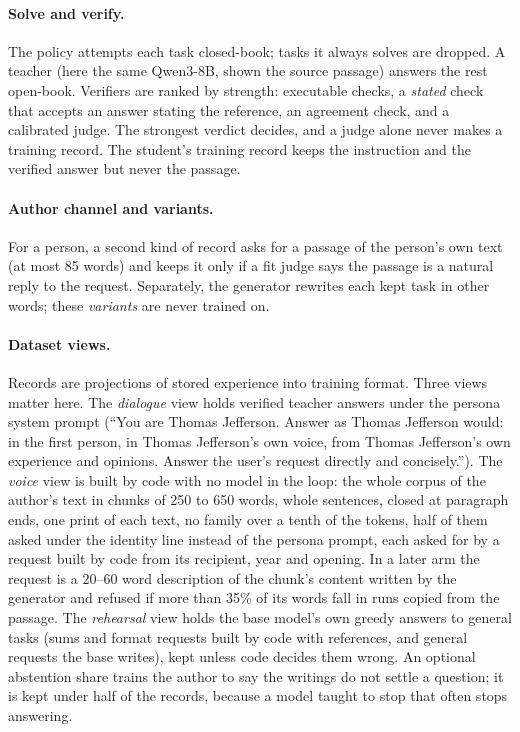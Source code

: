 \paragraph{Solve and verify.}
The policy attempts each task closed-book; tasks it always solves are dropped. A teacher
(here the same Qwen3-8B, shown the source passage) answers the rest open-book. Verifiers
are ranked by strength: executable checks, a \emph{stated} check that accepts an answer
stating the reference, an agreement check, and a calibrated judge. The strongest verdict
decides, and a judge alone never makes a training record. The student's training record
keeps the instruction and the verified answer but never the passage.

\paragraph{Author channel and variants.}
For a person, a second kind of record asks for a passage of the person's own text (at most 85
words) and keeps it only if a fit judge says the passage is a natural reply to the request.
Separately, the generator rewrites each kept task in other words; these \emph{variants} are
never trained on.

\paragraph{Dataset views.}
Records are projections of stored experience into training format. Three views matter here.
The \emph{dialogue} view holds verified teacher answers under the persona system prompt
(``You are Thomas Jefferson. Answer as Thomas Jefferson would: in the first person, in
Thomas Jefferson's own voice, from Thomas Jefferson's own experience and opinions. Answer the
user's request directly and concisely.''). The \emph{voice} view is built by code with no model
in the loop: the whole corpus of the author's text in chunks of 250 to 650 words, whole
sentences, closed at paragraph ends, one print of each text, no family over a tenth of the
tokens, half of them asked under the identity line instead of the persona prompt, each asked
for by a request built by code from its recipient, year and opening. In a later arm the
request is a 20--60 word description of the chunk's content written by the generator and
refused if more than 35\% of its words fall in runs copied from the passage. The
\emph{rehearsal} view holds the base model's own greedy answers to general tasks (sums and
format requests built by code with references, and general requests the base writes), kept
unless code decides them wrong. An optional abstention share trains the author to say the
writings do not settle a question; it is kept under half of the records, because a model
taught to stop that often stops answering.

